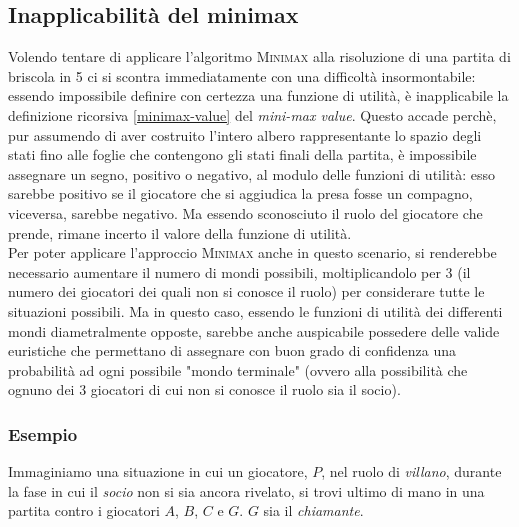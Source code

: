 \subsection{Inapplicabilità del minimax}
Volendo tentare di applicare l'algoritmo \textsc{Minimax} alla risoluzione di una partita di briscola in 5 ci si scontra immediatamente con una difficoltà insormontabile: essendo impossibile definire con certezza una funzione di utilità, è inapplicabile la definizione ricorsiva \ref{minimax-value} del \emph{mini-max value}.
Questo accade perchè, pur assumendo di aver costruito l'intero albero rappresentante lo spazio degli stati fino alle foglie che contengono gli stati finali della partita, è impossibile assegnare un segno, positivo o negativo, al modulo delle funzioni di utilità: esso sarebbe positivo se il giocatore che si aggiudica la presa fosse un compagno, viceversa, sarebbe negativo.
Ma essendo sconosciuto il ruolo del giocatore che prende, rimane incerto il valore della funzione di utilità.\\
Per poter applicare l'approccio \textsc{Minimax} anche in questo scenario, si renderebbe necessario aumentare il numero di mondi possibili, moltiplicandolo per 3 (il numero dei giocatori dei quali non si conosce il ruolo) per considerare tutte le situazioni possibili.
Ma in questo caso, essendo le funzioni di utilità dei differenti mondi diametralmente opposte, sarebbe anche auspicabile possedere delle valide euristiche che permettano di assegnare con buon grado di confidenza una probabilità ad ogni possibile "mondo terminale" (ovvero alla possibilità che ognuno dei 3 giocatori di cui non si conosce il ruolo sia il socio).

\subsubsection*{Esempio}
Immaginiamo una situazione in cui un giocatore, $P$, nel ruolo di \emph{villano}, durante la fase in cui il \emph{socio} non si sia ancora rivelato, si trovi ultimo di mano in una partita contro i giocatori $A$, $B$, $C$ e $G$. $G$ sia il \emph{chiamante}.\\

